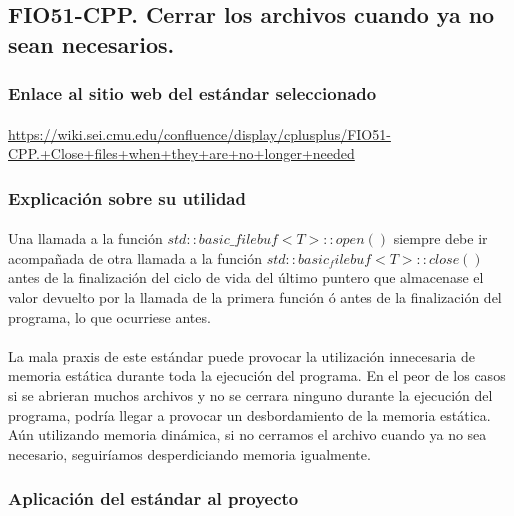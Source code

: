 	\subsection{FIO51-CPP. Cerrar los archivos cuando ya no sean necesarios.}
	
		\subsubsection{Enlace al sitio web del estándar seleccionado}
		
			\paragraph{}\url{https://wiki.sei.cmu.edu/confluence/display/cplusplus/FIO51-CPP.+Close+files+when+they+are+no+longer+needed}
		
		\subsubsection{Explicación sobre su utilidad}
		
			\paragraph{}Una llamada a la función $std::basic\_filebuf<T>::open()$ siempre debe ir acompañada de otra llamada a la función $std::basic_filebuf<T>::close()$ antes de la finalización del ciclo de vida del último puntero que almacenase el valor devuelto por la llamada de la primera función ó antes de la finalización del programa, lo que ocurriese antes.
			
			\paragraph{}La mala praxis de este estándar puede provocar la utilización innecesaria de memoria estática durante toda la ejecución del programa. En el peor de los casos si se abrieran muchos archivos y no se cerrara ninguno durante la ejecución del programa, podría llegar a provocar un desbordamiento de la memoria estática. Aún utilizando memoria dinámica, si no cerramos el archivo cuando ya no sea necesario, seguiríamos desperdiciando memoria igualmente.
		
		\subsubsection{Aplicación del estándar al proyecto}
		
